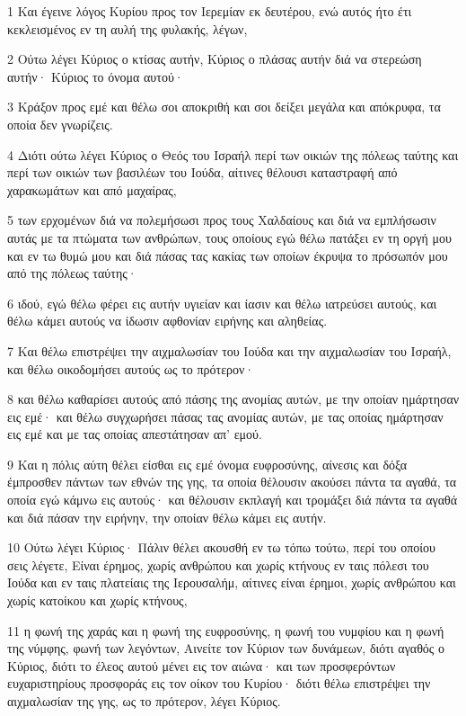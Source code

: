 \par 1 Και έγεινε λόγος Κυρίου προς τον Ιερεμίαν εκ δευτέρου, ενώ αυτός ήτο έτι κεκλεισμένος εν τη αυλή της φυλακής, λέγων,
\par 2 Ούτω λέγει Κύριος ο κτίσας αυτήν, Κύριος ο πλάσας αυτήν διά να στερεώση αυτήν· Κύριος το όνομα αυτού·
\par 3 Κράξον προς εμέ και θέλω σοι αποκριθή και σοι δείξει μεγάλα και απόκρυφα, τα οποία δεν γνωρίζεις.
\par 4 Διότι ούτω λέγει Κύριος ο Θεός του Ισραήλ περί των οικιών της πόλεως ταύτης και περί των οικιών των βασιλέων του Ιούδα, αίτινες θέλουσι καταστραφή από χαρακωμάτων και από μαχαίρας,
\par 5 των ερχομένων διά να πολεμήσωσι προς τους Χαλδαίους και διά να εμπλήσωσιν αυτάς με τα πτώματα των ανθρώπων, τους οποίους εγώ θέλω πατάξει εν τη οργή μου και εν τω θυμώ μου και διά πάσας τας κακίας των οποίων έκρυψα το πρόσωπόν μου από της πόλεως ταύτης·
\par 6 ιδού, εγώ θέλω φέρει εις αυτήν υγιείαν και ίασιν και θέλω ιατρεύσει αυτούς, και θέλω κάμει αυτούς να ίδωσιν αφθονίαν ειρήνης και αληθείας.
\par 7 Και θέλω επιστρέψει την αιχμαλωσίαν του Ιούδα και την αιχμαλωσίαν του Ισραήλ, και θέλω οικοδομήσει αυτούς ως το πρότερον·
\par 8 και θέλω καθαρίσει αυτούς από πάσης της ανομίας αυτών, με την οποίαν ημάρτησαν εις εμέ· και θέλω συγχωρήσει πάσας τας ανομίας αυτών, με τας οποίας ημάρτησαν εις εμέ και με τας οποίας απεστάτησαν απ' εμού.
\par 9 Και η πόλις αύτη θέλει είσθαι εις εμέ όνομα ευφροσύνης, αίνεσις και δόξα έμπροσθεν πάντων των εθνών της γης, τα οποία θέλουσιν ακούσει πάντα τα αγαθά, τα οποία εγώ κάμνω εις αυτούς· και θέλουσιν εκπλαγή και τρομάξει διά πάντα τα αγαθά και διά πάσαν την ειρήνην, την οποίαν θέλω κάμει εις αυτήν.
\par 10 Ούτω λέγει Κύριος· Πάλιν θέλει ακουσθή εν τω τόπω τούτω, περί του οποίου σεις λέγετε, Είναι έρημος, χωρίς ανθρώπου και χωρίς κτήνους εν ταις πόλεσι του Ιούδα και εν ταις πλατείαις της Ιερουσαλήμ, αίτινες είναι έρημοι, χωρίς ανθρώπου και χωρίς κατοίκου και χωρίς κτήνους,
\par 11 η φωνή της χαράς και η φωνή της ευφροσύνης, η φωνή του νυμφίου και η φωνή της νύμφης, φωνή των λεγόντων, Αινείτε τον Κύριον των δυνάμεων, διότι αγαθός ο Κύριος, διότι το έλεος αυτού μένει εις τον αιώνα· και των προσφερόντων ευχαριστηρίους προσφοράς εις τον οίκον του Κυρίου· διότι θέλω επιστρέψει την αιχμαλωσίαν της γης, ως το πρότερον, λέγει Κύριος.

